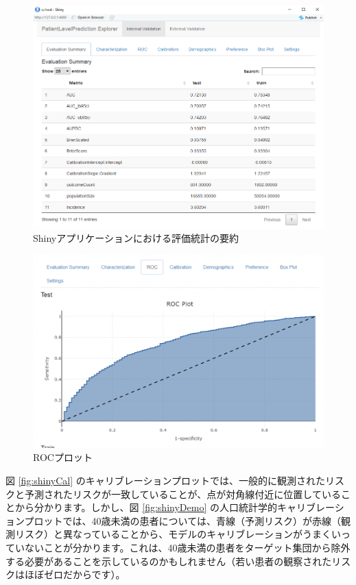 \documentclass[
  11pt]{book}
\theoremstyle{definition}
\theoremstyle{definition}
\theoremstyle{definition}
\theoremstyle{definition}
\theoremstyle{remark}
\begin{document}
\begin{figure}
\includegraphics[width=1\linewidth]{images/PatientLevelPrediction/shinysummary} \caption{Shinyアプリケーションにおける評価統計の要約}\label{fig:shinySummary}
\end{figure}

\begin{figure}

{\centering \includegraphics[width=1\linewidth]{images/PatientLevelPrediction/shiny/singleShiny/singleShinyRoc} 

}

\caption{ROCプロット}\label{fig:shinyROC}
\end{figure}

図 \ref{fig:shinyCal} のキャリブレーションプロットでは、一般的に観測されたリスクと予測されたリスクが一致していることが、点が対角線付近に位置していることから分かります。しかし、図 \ref{fig:shinyDemo} の人口統計学的キャリブレーションプロットでは、40歳未満の患者については、青線（予測リスク）が赤線（観測リスク）と異なっていることから、モデルのキャリブレーションがうまくいっていないことが分かります。これは、40歳未満の患者をターゲット集団から除外する必要があることを示しているのかもしれません（若い患者の観察されたリスクはほぼゼロだからです）。
\end{document}
